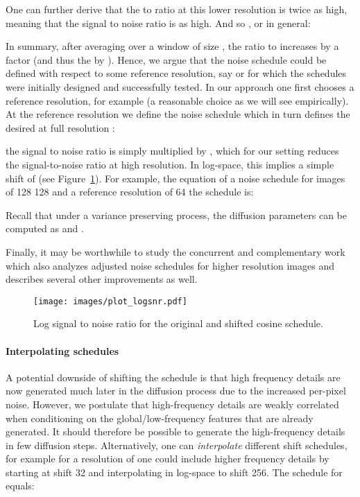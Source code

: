 \documentclass[nohyperref]{article}
\theoremstyle{plain}
\theoremstyle{definition}
\theoremstyle{remark}
\begin{document}
One can further derive that the  to  ratio at this lower resolution is twice as high, meaning that the signal to noise ratio is  as high. And so , or in general:

In summary, after averaging over a window of size , the ratio  to  increases by a factor  (and thus the  by ). Hence, we argue that the noise schedule could be defined with respect to some reference resolution, say  or  for which the schedules were initially designed and successfully tested. 
In our approach one first chooses a reference resolution, for example  (a reasonable choice as we will see empirically). At the reference resolution we define the noise schedule  which in turn defines the desired  at full resolution :

the signal to noise ratio is simply multiplied by , which for our setting  reduces the signal-to-noise ratio at high resolution. In log-space, this implies a simple shift of  (see Figure~\ref{fig:diffusion_shifted_snr}). For example, the equation of a noise schedule for images of 128  128 and a reference resolution of 64 the schedule is:

Recall that under a variance preserving process, the diffusion parameters can be computed as  and .

Finally, it may be worthwhile to study the concurrent and complementary work \citep{chen2023importancenoise} which also analyzes adjusted noise schedules for higher resolution images and describes several other improvements as well.

\begin{figure}
    \centering
    \texttt{[image: images/plot\_logsnr.pdf]}\vspace{-.1cm}
    \caption{Log signal to noise ratio for the original and shifted cosine schedule.}
    \label{fig:diffusion_shifted_snr}
\end{figure}

\paragraph{Interpolating schedules}
A potential downside of shifting the schedule is that high frequency details are now generated much later in the diffusion process due to the increased per-pixel noise. However, we postulate that high-frequency details are weakly correlated when conditioning on the global/low-frequency features that are already generated. It should therefore be possible to generate the high-frequency details in few diffusion steps. Alternatively, one can \textit{interpolate} different shift schedules, for example for a resolution of  one could include higher frequency details by starting at shift 32 and interpolating in log-space to shift 256. The schedule for  equals:
\end{document}
